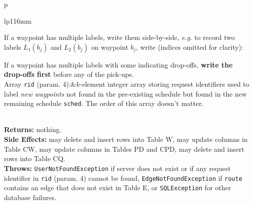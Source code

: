 \begin{tabular}{p{\textwidth}}
\begin{tabular}{lp{116mm}}

If a waypoint has multiple labels, write them side-by-side, \textit{e.g.}
to record two labels $L_1(b_j)$ and $L_2(b_j)$ on waypoint $b_j$, write
(indices omitted for clarity):


If a waypoint has multiple labels with some indicating drop-offs, \textbf{write
the drop-offs first} before any of the pick-ups.\\
Array {\tt{}rid} (param. 4):&$k$-element integer array storing request identifiers
used to label \emph{new waypoints} not found in the pre-existing schedule but
found in the new remaining schedule {\tt{}sched}. The order of this array doesn't
matter.
\end{tabular}\\
\textbf{Returns:} nothing.\\
\textbf{Side Effects:} may delete and insert rows into Table W, may
update columns in Table CW, may update columns in Tables PD and CPD,
may delete and insert rows into Table CQ.\\
\textbf{Throws:} {\tt{}UserNotFoundException} if server does not exist or if any
request identifier in {\tt{}rid} (param. 4) cannot be found,
{\tt{}EdgeNotFoundException} if {\tt{}route} contains an edge that does not exist in
Table E, or {\tt{}SQLException} for other database failures.\\
\bottomrule
\end{tabular}
\nwenddocs{}\endmoddef{}
